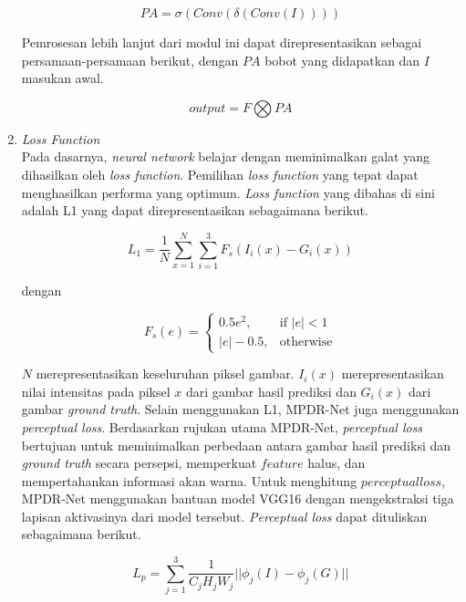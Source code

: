 \documentclass[11pt, a4paper, final]{report}
\begin{document}
\begin{enumerate}
    \begin{equation} \label{eq23}
    PA=\sigma(Conv(\delta(Conv(I))))
    \end{equation}
    
    Pemrosesan lebih lanjut dari modul ini dapat direpresentasikan sebagai persamaan-persamaan berikut, dengan $PA$ bobot yang didapatkan dan $I$ masukan awal.
    
    \begin{equation} \label{eq24}
    output=F\bigotimes{PA}
    \end{equation}
    
    \item \textit{Loss Function}\\
    Pada dasarnya, \textit{neural network} belajar dengan meminimalkan galat yang dihasilkan oleh \textit{loss function}. Pemilihan \textit{loss function} yang tepat dapat menghasilkan performa yang optimum. \textit{Loss function} yang dibahas di sini adalah L1 yang dapat direpresentasikan sebagaimana berikut.
    
    \begin{equation} \label{eq25}
    L_1=\dfrac{1}{N}\sum_{x=1}^{N}\sum_{i=1}^{3}F_s(I_i(x)-G_i(x))
    \end{equation}
    
    dengan
    
    \begin{equation} \label{eq26}
        F_s(e)= 
        \begin{cases}
            0.5e^2,& \text{if } |e|<1\\
            |e|-0.5,& \text{otherwise}
        \end{cases}
    \end{equation}
    
    $N$ merepresentasikan keseluruhan piksel gambar. $I_i(x)$ merepresentasikan nilai intensitas pada piksel $x$ dari gambar hasil prediksi dan $G_i(x)$ dari gambar \textit{ground truth}. Selain menggunakan L1, MPDR-Net juga menggunakan \textit{perceptual loss}. Berdasarkan rujukan utama MPDR-Net, \textit{perceptual loss} bertujuan untuk meminimalkan perbedaan antara gambar hasil prediksi dan \textit{ground truth} secara persepsi, memperkuat $feature$ halus, dan mempertahankan informasi akan warna. Untuk menghitung $perceptual loss$, MPDR-Net menggunakan bantuan model VGG16 dengan mengekstraksi tiga lapisan aktivasinya dari model tersebut. \textit{Perceptual loss} dapat dituliskan sebagaimana berikut.
    
    \begin{equation} \label{eq27}
    L_p=\sum_{j=1}^{3}\dfrac{1}{C_jH_jW_j}||\phi_j(I)-\phi_j(G)||
    \end{equation}
    

\end{enumerate}
\end{document}
